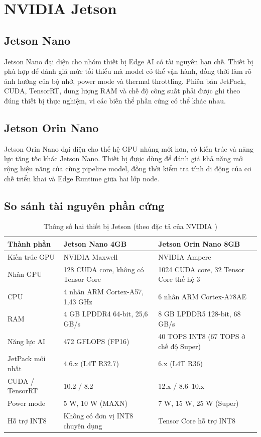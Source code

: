 \section{NVIDIA Jetson}

\subsection{Jetson Nano}

Jetson Nano đại diện cho nhóm thiết bị Edge AI có tài nguyên hạn chế. Thiết bị
phù hợp để đánh giá mức tối thiểu mà model có thể vận hành, đồng thời làm rõ ảnh
hưởng của bộ nhớ, power mode và thermal throttling. Phiên bản JetPack, CUDA,
TensorRT, dung lượng RAM và chế độ công suất phải được ghi theo đúng thiết bị
thực nghiệm, vì các biến thể phần cứng có thể khác nhau.

\subsection{Jetson Orin Nano}

Jetson Orin Nano đại diện cho thế hệ GPU nhúng mới hơn, có kiến trúc và năng lực
tăng tốc khác Jetson Nano. Thiết bị được dùng để đánh giá khả năng mở rộng hiệu
năng của cùng pipeline model, đồng thời kiểm tra tính di động của cơ chế triển
khai và Edge Runtime giữa hai lớp node.

\subsection{So sánh tài nguyên phần cứng}

\begin{table}[H]
\centering
\caption{Thông số hai thiết bị Jetson (theo đặc tả của NVIDIA \cite{jetson})}
\label{tab:jetson-hardware}
\begin{tabularx}{\textwidth}{L{3.6cm}YY}
\toprule
\textbf{Thành phần} & \textbf{Jetson Nano 4GB} & \textbf{Jetson Orin Nano 8GB}\\
\midrule
Kiến trúc GPU & NVIDIA Maxwell & NVIDIA Ampere\\
Nhân GPU & 128 CUDA core, không có Tensor Core & 1024 CUDA core, 32 Tensor Core thế hệ 3\\
CPU & 4 nhân ARM Cortex-A57, 1,43 GHz & 6 nhân ARM Cortex-A78AE\\
RAM & 4 GB LPDDR4 64-bit, 25,6 GB/s & 8 GB LPDDR5 128-bit, 68 GB/s\\
Năng lực AI & 472 GFLOPS (FP16) & 40 TOPS INT8 (67 TOPS ở chế độ Super)\\
JetPack mới nhất & 4.6.x (L4T R32.7) & 6.x (L4T R36)\\
CUDA / TensorRT & 10.2 / 8.2 & 12.x / 8.6--10.x\\
Power mode & 5 W, 10 W (MAXN) & 7 W, 15 W, 25 W (Super)\\
Hỗ trợ INT8 & Không có đơn vị INT8 chuyên dụng & Tensor Core hỗ trợ INT8\\
\bottomrule
\end{tabularx}
\end{table}


